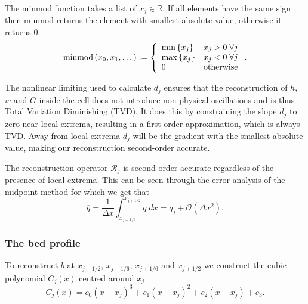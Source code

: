 \begin{defn}
The minmod function takes a list of $x_j \in \mathbb{R}$. If all elements have the same sign then minmod returns the element with smallest absolute value, otherwise it returns $0$. 
	\begin{equation*}
	\text{minmod}\left(x_0,x_1,\dots\right) := \left\lbrace \begin{array}{l l}
	\min\left\lbrace x_j\right\rbrace & x_j > 0 \; \forall j \\
	\max\left\lbrace x_j\right\rbrace & x_j < 0  \; \forall j \\
	0 & \text{otherwise}\\
	\end{array} \right. . 
	\end{equation*}
\end{defn}
The nonlinear limiting used to calculate $d_j$ ensures that the reconstruction of $h$, $w$ and $G$ inside the cell does not introduce non-physical oscillations and is thus Total Variation Diminishing (TVD). It does this by constraining the slope $d_j$ to zero near local extrema, resulting in a first-order approximation, which is always TVD. Away from local extrema $d_j$ will be the gradient with the smallest absolute value, making our reconstruction second-order accurate.

The reconstruction operator $\mathcal{R}_{j} $ is second-order accurate regardless of the presence of local extrema. This can be seen through the error analysis of the midpoint method for which we get that
\begin{equation}
\overline{q} = \frac{1}{\Delta x} \int_{x_{j-1/2}}^{x_{j+1/2}} q \; dx = q_j + \mathcal{O}\left(\Delta x^2\right).
\end{equation}

\subsubsection{The bed profile}
To reconstruct $b$ at $x_{j-1/2}$, $x_{j-1/6}$, $x_{j+1/6}$ and $x_{j+1/2}$ we construct the cubic polynomial $C_j(x)$ centred around $x_j$
\begin{equation}
C_j(x) = c_0 \left(x - x_j\right)^3 + c_1 \left(x - x_j\right)^2 + c_2 \left(x - x_j\right) + c_3.
\label{eqn:cubicforbedrecon}
\end{equation}

